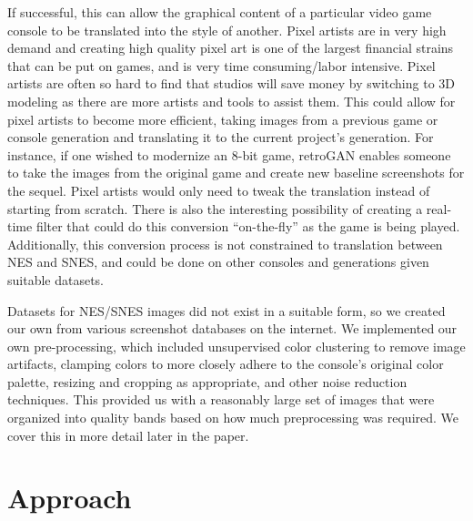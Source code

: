 \documentclass[10pt,twocolumn,letterpaper]{article}
\begin{document}
If successful, this can allow the graphical content of a particular video game console to be translated into the style of another. Pixel artists are in very high demand and creating high quality pixel art is one of the largest financial strains that can be put on games, and is very time consuming/labor intensive. Pixel artists are often so hard to find that studios will save money by switching to 3D modeling as there are more artists and tools to assist them. This could allow for pixel artists to become more efficient, taking images from a previous game or console generation and translating it to the current project's generation. For instance, if one wished to modernize an 8-bit game, retroGAN enables someone to take the images from the original game and create new baseline screenshots for the sequel. Pixel artists would only need to tweak the translation instead of starting from scratch. There is also the interesting possibility of creating a real-time filter that could do this conversion ``on-the-fly'' as the game is being played. Additionally, this conversion process is not constrained to translation between NES and SNES, and could be done on other consoles and generations given suitable datasets.


Datasets for NES/SNES images did not exist in a suitable form, so we created our own from various screenshot databases on the internet. We implemented our own pre-processing, which included unsupervised color clustering to remove image artifacts, clamping colors to more closely adhere to the console's original color palette, resizing and cropping as appropriate, and other noise reduction techniques. This provided us with a reasonably large set of images that were organized into quality bands based on how much preprocessing was required. We cover this in more detail later in the paper.

\section{Approach}

\end{document}
